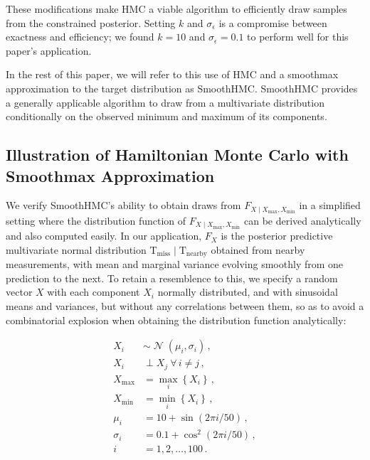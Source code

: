 \documentclass[letter]{article}
\newcommand{\genericdel}[3]{%
      \left#1#3\right#2
    }
\newcommand{\del}[1]{\genericdel(){#1}}
\newcommand{\cbr}[1]{\genericdel\{\}{#1}}
\DeclareMathOperator{\normal}{\mathcal{N}}
\newcommand{\T}{\mathrm{T}}
\newcommand{\indep}{\perp}
\newcommand{\miss}{\mathrm{miss}}
\newcommand{\obs}{\mathrm{nearby}}
\newcommand{\Xmax}{X_{\max}}
\newcommand{\Xmin}{X_{\min}}
\newcommand{\Fcond}{F_{X \mid \Xmax,\Xmin}}
\newcommand{\eqlabel}[1]{\label{#1}}
\begin{document}
These modifications make HMC a viable algorithm to efficiently draw samples from the constrained posterior.
Setting \(k\) and \(\sigma_\epsilon\) is a compromise between exactness and efficiency;
we found \(k=10\) and \(\sigma_\epsilon=0.1\) to perform well for this paper's application.

In the rest of this paper, we will refer to this use of HMC and a smoothmax approximation to the target distribution as SmoothHMC.
SmoothHMC provides a generally applicable algorithm to draw from a multivariate distribution conditionally on the observed minimum and maximum of its components.
    


        \subsection{Illustration of Hamiltonian Monte Carlo with Smoothmax Approximation}\label{illustration-of-hamiltonian-monte-carlo-with-smoothmax-approximation}
    

\label{sec:toy_example}
        We verify SmoothHMC's ability to obtain draws from \(\Fcond\) in a simplified setting where the distribution function of \(\Fcond\) can be derived analytically and also computed easily.
In our application, \(F_X\) is the posterior predictive multivariate normal distribution \(\T_\miss \mid \T_\obs\) obtained from nearby measurements, with mean and marginal variance evolving smoothly from one prediction to the next.
To retain a resemblence to this, we specify a random vector \(X\) with each component \(X_i\) normally distributed, and with sinusoidal means and variances, but without any correlations between them,
so as to avoid a combinatorial explosion when obtaining the distribution function analytically:

\begin{equation}
\begin{split}
X_i &\sim \normal \del{\mu_i, \sigma_i} \,, \\
X_i & \indep X_j ~\forall\, i \neq j \,, \\
\Xmax &= \max_i\cbr{X_i} \,, \\
\Xmin &= \min_i\cbr{X_i} \,,\\
\mu_i &= 10 + \sin\del{2\pi i / 50} \,, \\
\sigma_i &= 0.1+\cos^2\del{2\pi i / 50} \,, \\
i &= 1, 2, \ldots, 100 \,.
\end{split}
\eqlabel{eq:toyspec}
\end{equation}
\end{document}
